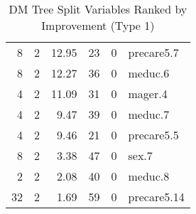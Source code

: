 \begin{table}[htbp]
\begin{tabular}{rrrrrl}
  8 & 2 & 12.95 & 23 & 0 & precare5.7 \\ 
  8 & 2 & 12.27 & 36 & 0 & meduc.6 \\ 
  4 & 2 & 11.09 & 31 & 0 & mager.4 \\ 
  4 & 2 & 9.47 & 39 & 0 & meduc.7 \\ 
  4 & 2 & 9.46 & 21 & 0 & precare5.5 \\ 
  8 & 2 & 3.38 & 47 & 0 & sex.7 \\ 
  2 & 2 & 2.08 & 40 & 0 & meduc.8 \\ 
  32 & 2 & 1.69 & 59 & 0 & precare5.14 \\ 
   \hline
\end{tabular}
\endgroup
\caption{DM Tree Split Variables Ranked by Improvement (Type 1)} 
\label{tab:splits_type1}
\end{table}
